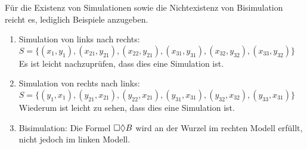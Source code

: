 \begin{center}
\begin{minipage}{0.4\textwidth}
\end{minipage}
\end{center}

Für die Existenz von Simulationen sowie die Nichtexistenz von Bisimulation reicht es,
lediglich Beispiele anzugeben.

\begin{enumerate}
	\item Simulation von links nach rechts: $S = \{ (x_1,y_1), (x_{21}, y_{21}), (x_{22}, y_{21}), (x_{31}, y_{31}), (x_{32},  y_{32}), (x_{33}, y_{32}) \}$
		Es ist leicht nachzuprüfen, dass dies eine Simulation ist.
	\item Simulation von rechts nach links: $S = \{ (y_1,x_1), (y_{21}, x_{21}), (y_{22}, x_{21}), (y_{31}, x_{31}), (y_{32},  x_{32}), (y_{33}, x_{31}) \}$
		Wiederum ist leicht zu sehen, dass dies eine Simulation ist.
	\item Bisimulation: Die Formel $\Box \Diamond B$ wird an der Wurzel im rechten Modell erfüllt, nicht jedoch im linken Modell.
\end{enumerate}





